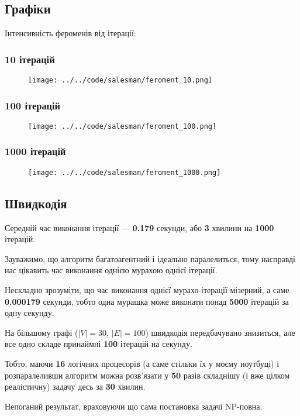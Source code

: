 \documentclass[a4paper, 12pt]{article}
\numberwithin{equation}{section}
\begin{document}
\subsection{Графіки}

Інтенсивність фероменів від ітерації:

\subsubsection{10 ітерацій}

\begin{figure}[H]
    \centering
    \texttt{[image: ../../code/salesman/feroment\_10.png]}
\end{figure}

\subsubsection{100 ітерацій}

\begin{figure}[H]
    \centering
    \texttt{[image: ../../code/salesman/feroment\_100.png]}
\end{figure}

\subsubsection{1000 ітерацій}

\begin{figure}[H]
    \centering
    \texttt{[image: ../../code/salesman/feroment\_1000.png]}
\end{figure}

\subsection{Швидкодія}

Середній час виконання ітерації --- \textbf{0.179} секунди, або \textbf{3} хвилини на \textbf{1000} ітерацій. \medskip

Зауважимо, що алгоритм багатоагентний і ідеально паралелиться, тому насправді нас цікавить час виконання однією мурахою однієї ітерації.  \medskip

Нескладно зрозуміти, що час виконання однієї мурахо-ітерації мізерний, а саме \textbf{0.000179} секунди, тобто одна мурашка може виконати понад \textbf{5000} ітерацій за одну секунду. \medskip

На більшому графі ($\vert V \vert = 30$, $\vert E \vert = 100$) швидкодія передбачувано знизиться, але все одно складе принаймні \textbf{100} ітерацій на секунду. \medskip

Тобто, маючи \textbf{16} логічних процесорів (а саме стільки їх у моєму ноутбуці) і розпаралеливши алгоритм можна розв'язати у \textbf{50} разів складнішу (і вже цілком реалістичну) задачу десь за \textbf{30} хвилин. \medskip

Непоганий результат, враховуючи що сама постановка задачі NP-повна.

% 
% 
\end{document}
